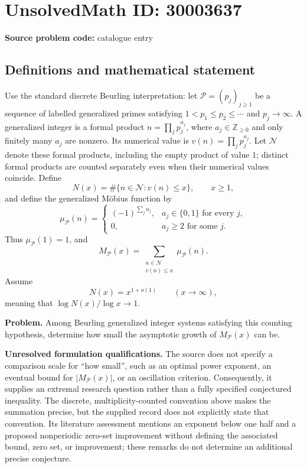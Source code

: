 \documentclass[11pt]{article}
\newcommand{\Z}{\mathbb{Z}}
\begin{document}
\section*{UnsolvedMath ID: 30003637}
\textbf{Source problem code:} catalogue entry
\subsection{Definitions and mathematical statement}
Use the standard discrete Beurling interpretation: let \(\mathcal P=(p_j)_{j\geq1}\) be a sequence of labelled generalized primes satisfying \(1<p_1\leq p_2\leq\cdots\) and \(p_j\to\infty\). A generalized integer is a formal product \(n=\prod_j p_j^{a_j}\), where \(a_j\in\Z_{\geq0}\) and only finitely many \(a_j\) are nonzero. Its numerical value is \(v(n)=\prod_j p_j^{a_j}\). Let \(\mathcal N\) denote these formal products, including the empty product of value \(1\); distinct formal products are counted separately even when their numerical values coincide. Define
\[
N(x)=\#\{n\in\mathcal N:v(n)\leq x\},\qquad x\geq1,
\]
and define the generalized Möbius function by
\[
\mu_{\mathcal P}(n)=
\begin{cases}
(-1)^{\sum_j a_j},&a_j\in\{0,1\}\text{ for every }j,\\
0,&a_j\geq2\text{ for some }j.
\end{cases}
\]
Thus \(\mu_{\mathcal P}(1)=1\), and
\[
M_{\mathcal P}(x)=\sum_{\substack{n\in\mathcal N\\v(n)\leq x}}\mu_{\mathcal P}(n).
\]
Assume
\[
N(x)=x^{1+o(1)}\qquad(x\to\infty),
\]
meaning that \(\log N(x)/\log x\to1\).

\textbf{Problem.} Among Beurling generalized integer systems satisfying this counting hypothesis, determine how small the asymptotic growth of \(M_{\mathcal P}(x)\) can be.

\textbf{Unresolved formulation qualifications.} The source does not specify a comparison scale for ``how small'', such as an optimal power exponent, an eventual bound for \(\lvert M_{\mathcal P}(x)\rvert\), or an oscillation criterion. Consequently, it supplies an extremal research question rather than a fully specified conjectured inequality. The discrete, multiplicity-counted convention above makes the summation precise, but the supplied record does not explicitly state that convention. Its literature assessment mentions an exponent below one half and a proposed nonperiodic zero-set improvement without defining the associated bound, zero set, or improvement; these remarks do not determine an additional precise conjecture.
\end{document}
